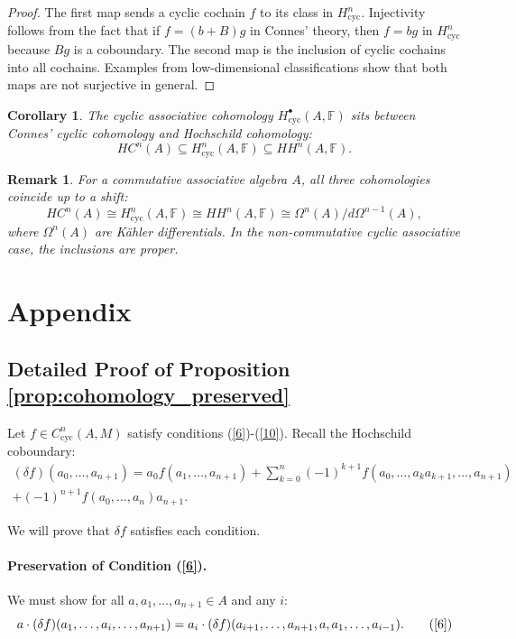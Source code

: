 \documentclass[pdflatex,sn-mathphys-num]{sn-jnl}%
\theoremstyle{thmstyleone}%
\newtheorem{remark}{Remark}[section]
\newtheorem{corollary}{Corollary}[section]
\theoremstyle{thmstyletwo}%
\theoremstyle{thmstylethree}%
\begin{document}
\begin{proof}
The first map sends a cyclic cochain $f$ to its class in $H^n_{\mathrm{cyc}}$. Injectivity follows from the fact that if $f = (b + B)g$ in Connes' theory, then $f = b g$ in $H^n_{\mathrm{cyc}}$ because $B g$ is a coboundary. The second map is the inclusion of cyclic cochains into all cochains. Examples from low-dimensional classifications show that both maps are not surjective in general. 
\end{proof}

\begin{corollary}
The cyclic associative cohomology $H^\bullet_{\mathrm{cyc}}(A, \mathbb{F})$ sits between Connes' cyclic cohomology and Hochschild cohomology:
\[
HC^n(A) \subseteq H^n_{\mathrm{cyc}}(A, \mathbb{F}) \subseteq HH^n(A, \mathbb{F}).
\]
\end{corollary}

\begin{remark}
For a commutative associative algebra $A$, all three cohomologies coincide up to a shift:
\[
HC^n(A) \cong H^n_{\mathrm{cyc}}(A, \mathbb{F}) \cong HH^n(A, \mathbb{F}) \cong \Omega^n(A) / d\Omega^{n-1}(A),
\]
where $\Omega^n(A)$ are Kähler differentials. In the non-commutative cyclic associative case, the inclusions are proper.
\end{remark}

\section{Appendix}
\subsection*{Detailed Proof of Proposition \ref{prop:cohomology_preserved}}\label{appendix:proof}




Let $f \in C^n_{\mathrm{cyc}}(A, M)$ satisfy conditions (\ref{6})-(\ref{10}). Recall the Hochschild coboundary:
\begin{align*}
(\delta f)(a_0, \dots, a_{n+1}) = a_0 f(a_1, \dots, a_{n+1}) + \sum_{k=0}^{n} (-1)^{k+1} f(a_0, \dots, a_k a_{k+1}, \dots, a_{n+1})\\ + (-1)^{n+1} f(a_0, \dots, a_n) a_{n+1}.
\end{align*}

We will prove that $\delta f$ satisfies each condition.

\medskip
\paragraph{Preservation of Condition (\ref{6}).}
We must show for all $a, a_1, \dots, a_{n+1} \in A$ and any $i$:
\[
a \cdot (\delta f)(a_1, \dots, a_i, \dots, a_{n+1}) = a_i \cdot (\delta f)(a_{i+1}, \dots, a_{n+1}, a, a_1, \dots, a_{i-1}). \qquad (\ref{6})
\]
\end{document}
